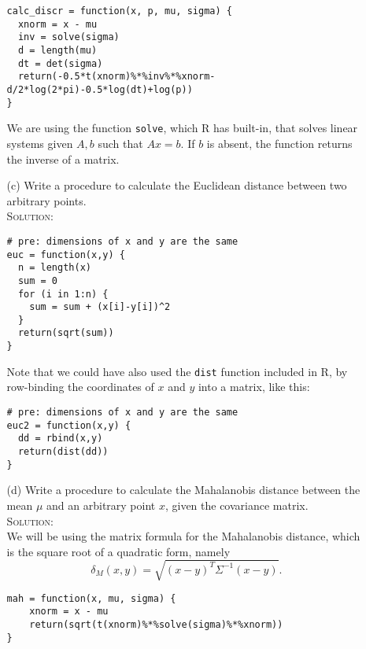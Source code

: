 \documentclass[10pt]{article}
\begin{document}
\begin{enumerate}
\begin{enumerate}
        \begin{verbatim}
calc_discr = function(x, p, mu, sigma) {
  xnorm = x - mu
  inv = solve(sigma)
  d = length(mu)
  dt = det(sigma)
  return(-0.5*t(xnorm)%*%inv%*%xnorm-d/2*log(2*pi)-0.5*log(dt)+log(p))
}
        \end{verbatim}
        We are using the function \verb|solve|, which R has built-in, that solves linear systems given $A,b$ such that $Ax=b$. If $b$ is absent, the function returns the inverse of a matrix.
    \item[(c)] Write a procedure to calculate the Euclidean distance between two arbitrary points.\\
        {\scshape Solution:}
        \begin{verbatim}
# pre: dimensions of x and y are the same
euc = function(x,y) {
  n = length(x)
  sum = 0
  for (i in 1:n) {
    sum = sum + (x[i]-y[i])^2
  }
  return(sqrt(sum))
}
        \end{verbatim}
        Note that we could have also used the \verb|dist| function included in R, by row-binding the coordinates of $x$ and $y$ into a matrix, like this:
        \begin{verbatim}
# pre: dimensions of x and y are the same
euc2 = function(x,y) {
  dd = rbind(x,y)
  return(dist(dd))
}
        \end{verbatim}
    \item[(d)] Write a procedure to calculate the Mahalanobis distance between the mean $\mu$ and an arbitrary point $x$, given the covariance matrix.\\
        {\scshape Solution:}\\
        We will be using the matrix formula for the Mahalanobis distance, which is the square root of a quadratic form, namely
        \[
        \delta_M(x,y)=\sqrt{(x-y)^T\Sigma^{-1}(x-y)}.
        \]
        \begin{verbatim}
mah = function(x, mu, sigma) {
    xnorm = x - mu
    return(sqrt(t(xnorm)%*%solve(sigma)%*%xnorm))
}
        \end{verbatim}
  \end{enumerate}
\end{enumerate}
\end{document}

